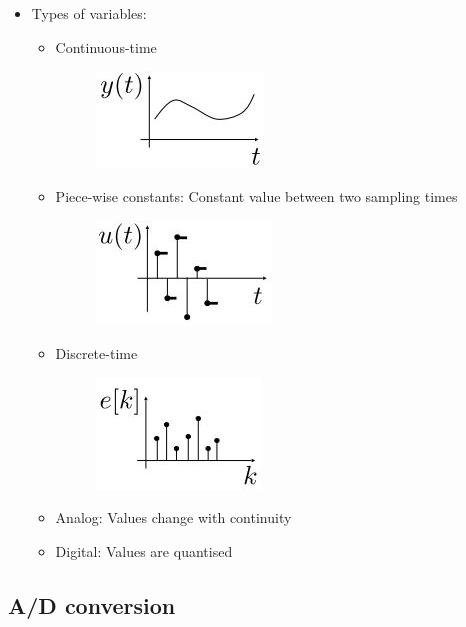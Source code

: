 \documentclass[conference]{IEEEtran}
\begin{document}
\begin{itemize}
    \item Types of variables:
    \begin{itemize}
        \item Continuous-time 
        \begin{figure} [h!]
            \centering
            \includegraphics[scale=0.7]{Ex3.JPG}
        \end{figure}
        \item Piece-wise constants: Constant value between two sampling times
        \begin{figure} [h!]
            \centering
            \includegraphics[scale=0.7]{Ex4.JPG}
        \end{figure}
        \item Discrete-time
        \begin{figure} [h!]
            \centering
            \includegraphics[scale=0.7]{Ex5.JPG}
        \end{figure} 
        \item Analog: Values change with continuity 
        \item Digital: Values are quantised
    \end{itemize}
\end{itemize}

\subsection{A/D conversion}
\end{document}
